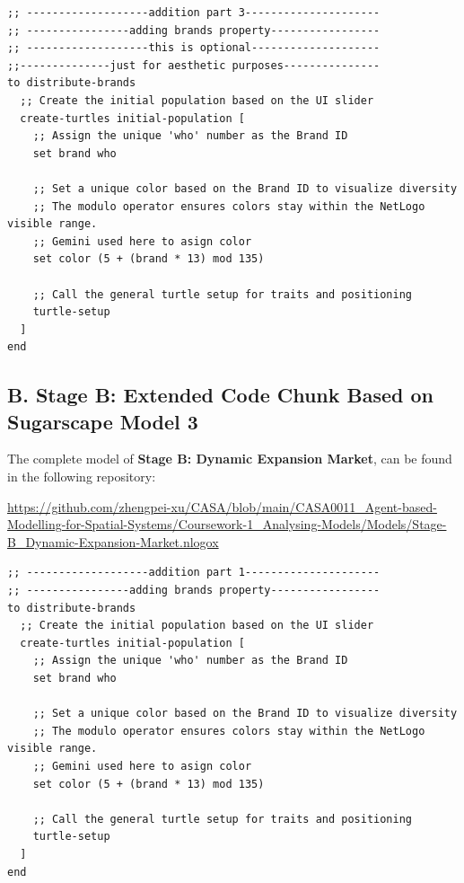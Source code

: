 \documentclass{article}
\begin{document}
\begin{lstlisting}[language=NetLogo, caption={Optional addition for brands property}]
;; -------------------addition part 3---------------------
;; ----------------adding brands property-----------------
;; -------------------this is optional--------------------
;;--------------just for aesthetic purposes---------------
to distribute-brands
  ;; Create the initial population based on the UI slider
  create-turtles initial-population [
    ;; Assign the unique 'who' number as the Brand ID 
    set brand who 
    
    ;; Set a unique color based on the Brand ID to visualize diversity
    ;; The modulo operator ensures colors stay within the NetLogo visible range.
    ;; Gemini used here to asign color
    set color (5 + (brand * 13) mod 135) 
    
    ;; Call the general turtle setup for traits and positioning
    turtle-setup
  ]
end
\end{lstlisting}












\subsection*{B. Stage B: Extended Code Chunk Based on Sugarscape Model 3}

\noindent The complete model of \textbf{Stage B: Dynamic Expansion Market}, can be found in the following repository:

\vspace{0.5em}
\noindent \url{https://github.com/zhengpei-xu/CASA/blob/main/CASA0011_Agent-based-Modelling-for-Spatial-Systems/Coursework-1_Analysing-Models/Models/Stage-B_Dynamic-Expansion-Market.nlogox}

\vspace{1.5em}


\begin{lstlisting}[language=NetLogo, caption={Introduction of brands property}]
;; -------------------addition part 1---------------------
;; ----------------adding brands property-----------------
to distribute-brands
  ;; Create the initial population based on the UI slider
  create-turtles initial-population [
    ;; Assign the unique 'who' number as the Brand ID 
    set brand who 
    
    ;; Set a unique color based on the Brand ID to visualize diversity
    ;; The modulo operator ensures colors stay within the NetLogo visible range.
    ;; Gemini used here to asign color
    set color (5 + (brand * 13) mod 135) 
    
    ;; Call the general turtle setup for traits and positioning
    turtle-setup
  ]
end
\end{lstlisting}
\end{document}

